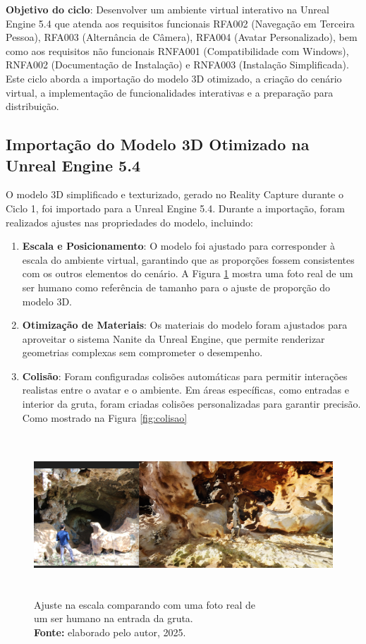 \textbf{Objetivo do ciclo}: Desenvolver um ambiente virtual interativo na Unreal Engine 5.4 que atenda aos requisitos funcionais RFA002 (Navegação em Terceira Pessoa), RFA003 (Alternância de Câmera), RFA004 (Avatar Personalizado), bem como aos requisitos não funcionais RNFA001 (Compatibilidade com Windows), RNFA002 (Documentação de Instalação) e RNFA003 (Instalação Simplificada). Este ciclo aborda a importação do modelo 3D otimizado, a criação do cenário virtual, a implementação de funcionalidades interativas e a preparação para distribuição.

\subsection{Importação do Modelo 3D Otimizado na Unreal Engine 5.4}
O modelo 3D simplificado e texturizado, gerado no Reality Capture durante o Ciclo 1, foi importado para a Unreal Engine 5.4. Durante a importação, foram realizados ajustes nas propriedades do modelo, incluindo:
\begin{enumerate}
    \item \textbf{Escala e Posicionamento}: O modelo foi ajustado para corresponder à escala do ambiente virtual, garantindo que as proporções fossem consistentes com os outros elementos do cenário. A Figura \ref{fig:escala} mostra uma foto real de um ser humano como referência de tamanho para o ajuste de proporção do modelo 3D.
    \item \textbf{Otimização de Materiais}: Os materiais do modelo foram ajustados para aproveitar o sistema Nanite da Unreal Engine, que permite renderizar geometrias complexas sem comprometer o desempenho.
    \item \textbf{Colisão}: Foram configuradas colisões automáticas para permitir interações realistas entre o avatar e o ambiente. Em áreas específicas, como entradas e interior da gruta, foram criadas colisões personalizadas para garantir precisão. Como mostrado na Figura \ref{fig:colisao}
\end{enumerate}

\begin{figure}[H]
        \centering
        \includegraphics[height=6cm, keepaspectratio]{img/unreal/escala.png}
        \caption{Ajuste na escala comparando com uma foto real de\\ um ser humano na entrada da gruta. \\
            \textbf{Fonte:} elaborado pelo autor, 2025.}
        \label{fig:escala}
\end{figure}


